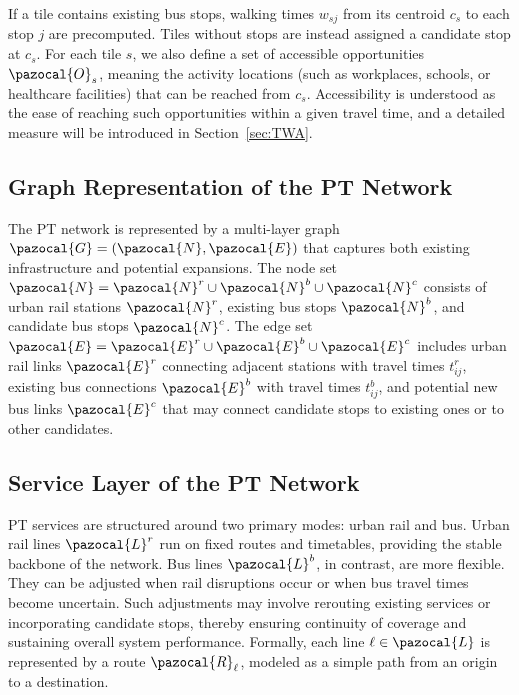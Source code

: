 \documentclass[3p,times,procedia]{elsarticle}
\begin{document}
If a tile contains existing bus stops, walking times $w_{sj}$ from its centroid $c_s$ to each stop $j$ are precomputed. 
Tiles without stops are instead assigned a candidate stop at $c_s$. 
For each tile $s$, we also define a set of accessible opportunities $\pazocal{O}_s$, 
meaning the activity locations (such as workplaces, schools, or healthcare facilities) that can be reached from $c_s$. 
Accessibility is understood as the ease of reaching such opportunities within a given travel time, 
and a detailed measure will be introduced in Section~\ref{sec:TWA}.

\subsection{Graph Representation of the PT Network}
The PT network is represented by a multi-layer graph $\pazocal{G} = (\pazocal{N}, \pazocal{E})$ that captures both existing infrastructure and potential expansions. The node set $\pazocal{N} = \pazocal{N}^r \cup \pazocal{N}^b \cup \pazocal{N}^c$ consists of urban rail stations $\pazocal{N}^r$, existing bus stops $\pazocal{N}^b$, and candidate bus stops $\pazocal{N}^c$. The edge set $\pazocal{E} = \pazocal{E}^r \cup \pazocal{E}^b \cup \pazocal{E}^c$ includes urban rail links $\pazocal{E}^r$ connecting adjacent stations with travel times $t_{ij}^r$, existing bus connections $\pazocal{E}^b$ with travel times $t_{ij}^b$, and potential new bus links $\pazocal{E}^c$ that may connect candidate stops to existing ones or to other candidates.

\subsection{Service Layer of the PT Network}
PT services are structured around two primary modes: urban rail and bus. %
Urban rail lines $\pazocal{L}^r$ run on fixed routes and timetables, providing the stable backbone of the network.  
Bus lines $\pazocal{L}^b$, in contrast, are more flexible. They can be adjusted when rail disruptions occur or when bus travel times become uncertain. Such adjustments may involve rerouting existing services or incorporating candidate stops, thereby ensuring continuity of coverage and sustaining overall system performance.  
%
Formally, each line $\ell \in \pazocal{L}$ is represented by a route $\pazocal{R}_\ell$, modeled as a simple path from an origin to a destination.  

\end{document}
